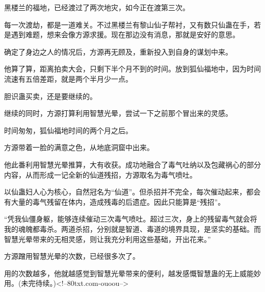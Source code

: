 \begin{this_body}
黑楼兰的福地，已经渡过了两次地灾，如今正在渡第三次。

每一次渡劫，都是一道难关。不过黑楼兰有黎山仙子帮衬，又有数只仙蛊在手，若是遇到难题，想来会像方源求援。现在那边没有消息，那就是安好的意思。

确定了身边之人的情况后，方源再无顾及，重新投入到自身的谋划中来。

他算了算，距离拍卖大会，只剩下半个月不到的时间。放到狐仙福地中，因为时间流速有五倍差距，就是两个半月少一点。

胆识蛊买卖，还是要继续的。

继续的同时，方源打算利用智慧光晕，尝试一下之前那个冒出来的灵感。

时间匆匆，狐仙福地时间的两个月之后。

方源带着一脸的满意之色，从地底洞窟中出来。

他此番利用智慧光晕推算，大有收获。成功地融合了毒气吐纳以及包藏祸心的部分内容，从而形成一记全新的仙道残招，方源取名为毒气喷吐。

以仙蛊妇人心为核心，自然冠名为“仙道”。但杀招并不完全，每次催动起来，都会有大量的毒气残留在体内，造成残毒的后遗症。因此只能算是“残招”。

“凭我仙僵身躯，能够连续催动三次毒气喷吐。超过三次，身上的残留毒气就会将我的魂魄都毒杀。两道杀招，分别就是智道、毒道的境界具现，是坚实的基础。而智慧光晕带来的无相灵感，则让我充分利用这些基础，开出花来。”

方源蹭用智慧光晕的次数，已经很多次了。

用的次数越多，他就越感觉到智慧光晕带来的便利，越发感慨智慧蛊的无上威能妙用。(未完待续。)<!--80txt.com-ouoou-->

\end{this_body}

